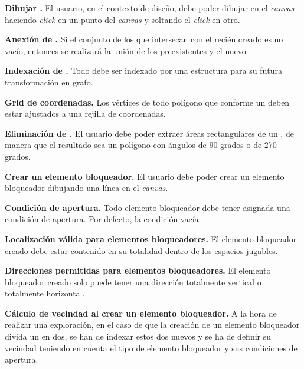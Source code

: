 	\item \textbf{Dibujar .}\newline
		El usuario, en el contexto de diseño, debe poder dibujar  en el \textit{canvas} haciendo \textit{click} en un punto del \textit{canvas} y soltando el \textit{click} en otro.
		\begin{functional}
			\item \textbf{Anexión de .}\newline
				Si el conjunto de los  que intersecan con el recién creado es no vacío, entonces se realizará la unión de los  preexistentes y el nuevo 
			\item \textbf{Indexación de .}\newline
				Todo  debe ser indexado por una estructura para su futura transformación en grafo.
			\item \textbf{Grid de coordenadas.}\newline
				Los vértices de todo polígono que conforme un  deben estar ajustados a una rejilla de coordenadas.
		\end{functional}
	\item \textbf{Eliminación de .}\newline
		El usuario debe poder extraer áreas rectangulares de un , de manera que el resultado sea un polígono con ángulos de 90 grados o de 270 grados.
	\item \textbf{Crear un elemento bloqueador.}\newline
		El usuario debe poder crear un elemento bloqueador dibujando una línea en el \textit{canvas}.
		\begin{functional}
			\item \textbf{Condición de apertura.}
				Todo elemento bloqueador debe tener asignada una condición de apertura. Por defecto, la condición vacía.
			\item \textbf{Localización válida para elementos bloqueadores.}\newline
				El elemento bloqueador creado debe estar contenido en su totalidad dentro de los espacios jugables.
			\item \textbf{Direcciones permitidas para elementos  bloqueadores.}\newline
				El elemento bloqueador creado solo puede tener una dirección totalmente vertical o totalmente horizontal.
			\item \textbf{Cálculo de vecindad al crear un elemento bloqueador.}\newline
				A la hora de realizar una exploración, en el caso de que la creación de un elemento bloqueador divida un  en dos, se han de indexar estos dos nuevos  y se ha de definir su vecindad teniendo en cuenta el tipo de elemento bloqueador y sus condiciones de apertura.
		\end{functional}
